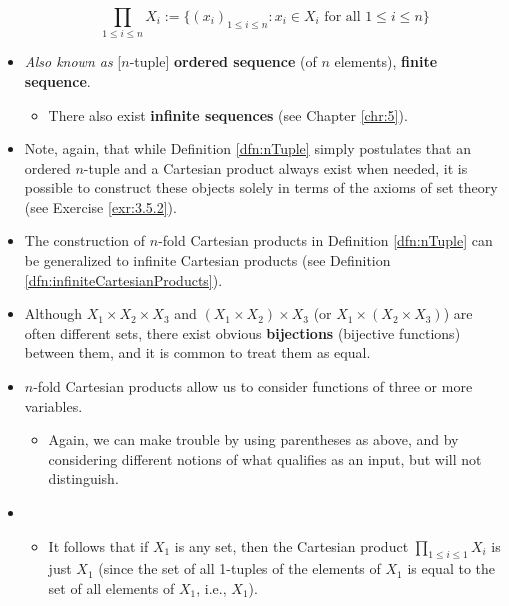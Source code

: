 \documentclass[../main.tex]{subfiles}
\begin{document}
\begin{itemize}
\begin{dfn}
        \begin{equation*}
            \prod_{1\leq i\leq n}X_i := \{(x_i)_{1\leq i\leq n}:x_i\in X_i\text{ for all }1\leq i\leq n\}
        \end{equation*}
    \end{dfn}
    \item \emph{Also known as} [$n$-tuple] \textbf{ordered sequence} (of $n$ elements), \textbf{finite sequence}.
    \begin{itemize}
        \item There also exist \textbf{infinite sequences} (see Chapter \ref{chr:5}).
    \end{itemize}
    \item Note, again, that while Definition \ref{dfn:nTuple} simply postulates that an ordered $n$-tuple and a Cartesian product always exist when needed, it is possible to construct these objects solely in terms of the axioms of set theory (see Exercise \ref{exr:3.5.2}).
    \item The construction of $n$-fold Cartesian products in Definition \ref{dfn:nTuple} can be generalized to infinite Cartesian products (see Definition \ref{dfn:infiniteCartesianProducts}).
    \item Although $X_1\times X_2\times X_3$ and $(X_1\times X_2)\times X_3$ (or $X_1\times(X_2\times X_3)$) are often different sets, there exist obvious \textbf{bijections} (bijective functions) between them, and it is common to treat them as equal.
    \item $n$-fold Cartesian products allow us to consider functions of three or more variables.
    \begin{itemize}
        \item Again, we can make trouble by using parentheses as above, and by considering different notions of what qualifies as an input, but \cite{bib:AnalysisI} will not distinguish.
    \end{itemize}
    \item {}
    \begin{itemize}
        \item It follows that if $X_1$ is any set, then the Cartesian product $\prod_{1\leq i\leq 1}X_i$ is just $X_1$ (since the set of all 1-tuples of the elements of $X_1$ is equal to the set of all elements of $X_1$, i.e., $X_1$).
    \end{itemize}

\end{itemize}
\end{document}
